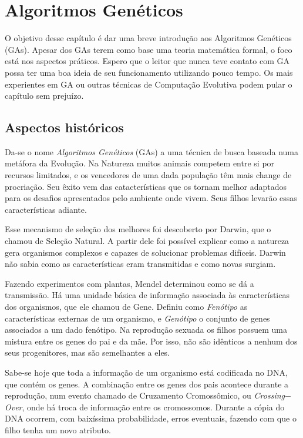 \chapter{Algoritmos Genéticos\label{cap:ga}}

O objetivo desse capítulo é dar uma breve introdução aos Algoritmos Genéticos (GAs). Apesar dos GAs terem como base uma teoria matemática formal, o foco está nos aspectos práticos. Espero que o leitor que nunca teve contato com GA possa ter uma boa ideia de seu funcionamento utilizando pouco tempo. Os mais experientes em GA ou outras técnicas de Computação Evolutiva podem pular o capítulo sem prejuízo.

\section{Aspectos históricos}

Da-se o nome \emph{Algoritmos Genéticos} (GAs) a uma técnica de busca baseada numa metáfora da Evolução. Na Natureza muitos animais competem entre si por recursos limitados, e os vencedores de uma dada população têm mais change de procriação. Seu êxito vem das catacterísticas que os tornam melhor adaptados para os desafios apresentados pelo ambiente onde vivem. Seus filhos levarão essas características adiante. 

Esse mecanismo de seleção dos melhores foi descoberto por Darwin, que o chamou de Seleção Natural. A partir dele foi possível explicar como a natureza gera organismos complexos e capazes de solucionar problemas difíceis. Darwin não sabia como as características eram transmitidas e como novas surgiam.

Fazendo experimentos com plantas, Mendel determinou como se dá a transmissão. Há uma unidade básica de informação associada às características dos organismos, que ele chamou de Gene. Definiu como \emph{Fenótipo} as características externas de um organismo, e \emph{Genótipo} o conjunto de genes associados a um dado fenótipo. Na reprodução sexuada os filhos possuem uma mistura entre os genes do pai e da mãe. Por isso, não são idênticos a nenhum dos seus progenitores, mas são semelhantes a eles.

Sabe-se hoje que toda a informação de um organismo está codificada no DNA, que contém os genes. A combinação entre os genes dos pais acontece durante a reprodução, num evento chamado de Cruzamento Cromossômico, ou \emph{Crossing$-$Over}, onde há troca de informação entre os cromossomos. Durante a cópia do DNA ocorrem, com baixíssima probabilidade, erros eventuais, fazendo com que o filho tenha um novo atributo. 

